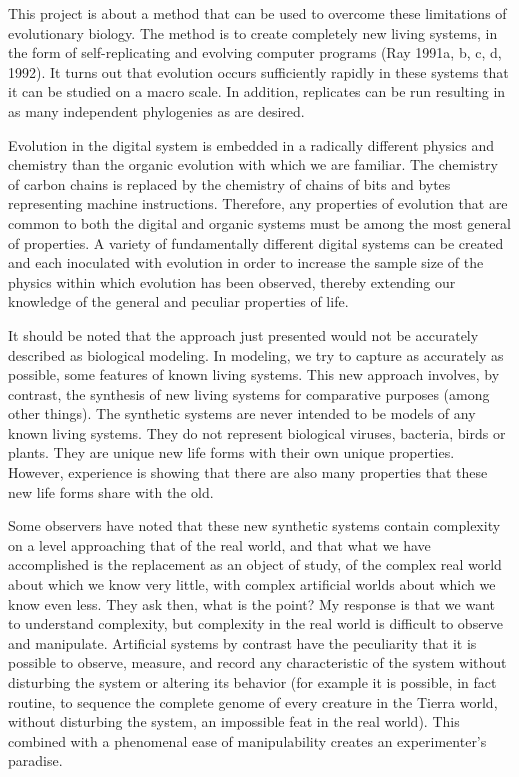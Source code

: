 This project is about a method that can be used to overcome these limitations
of evolutionary biology.  The method is to create completely new living
systems, in the form of self-replicating and evolving computer programs
(Ray 1991a, b, c, d, 1992).  It turns out that evolution occurs sufficiently
rapidly in these systems that it can be studied on a macro scale.  In addition,
replicates can be run resulting in as many independent phylogenies as are
desired.

Evolution in the digital system is embedded in a radically different physics
and chemistry than the organic evolution with which we are familiar.  The
chemistry of carbon chains is replaced by the chemistry of chains of bits
and bytes representing machine instructions.  Therefore, any properties of
evolution that are common to both the digital and organic systems must be
among the most general of properties.  A variety of fundamentally different
digital systems can be created and each inoculated with evolution in order
to increase the sample size of the physics within which evolution has been
observed, thereby extending our knowledge of the general and peculiar
properties of life.

It should be noted that the approach just presented would not be accurately
described as biological modeling.  In modeling, we try to capture as accurately
as possible, some features of known living systems.  This new approach
involves, by contrast, the synthesis of new living systems for comparative
purposes (among other things).  The synthetic systems are never intended
to be models of any known living systems.  They do not represent biological
viruses, bacteria, birds or plants.  They are unique new life forms with their
own unique properties.  However, experience is showing that there are also
many properties that these new life forms share with the old.

Some observers have noted that these new synthetic systems contain complexity
on a level approaching that of the real world, and that what we have
accomplished is the replacement as an object of study, of the complex real
world about which we know very little, with complex artificial worlds about
which we know even less.  They ask then, what is the point?  My response is
that we want to understand complexity, but complexity in the real world is
difficult to observe and manipulate.  Artificial systems by contrast have the
peculiarity that it is possible to observe, measure, and record any
characteristic of the system without disturbing the system or altering its
behavior (for example it is possible, in fact routine, to sequence the
complete genome of every creature in the Tierra world, without disturbing
the system, an impossible feat in the real world).  This combined with a
phenomenal ease of manipulability creates an experimenter's paradise.

